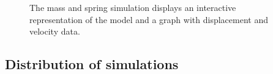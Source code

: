 \begin{figure}[htb]
  \centering
  \caption{The mass and spring simulation displays an interactive representation of the model and a graph with displacement and velocity data.}
  \label{fig:02EjsIntro/SpringRunning}
\end{figure}

\subsection{Distribution of simulations}\label{section:02Distribution}

